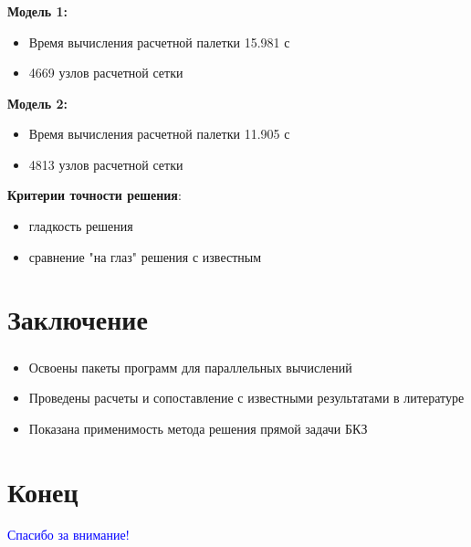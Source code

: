 \begin{frame}
\frametitle{\insertsection}

\textbf{Модель 1:}
\begin{itemize}
    \item Время вычисления расчетной палетки 15.981 с
    \item 4669 узлов расчетной сетки
\end{itemize}
\bigskip

\textbf{Модель 2:}
\begin{itemize}
    \item Время вычисления расчетной палетки 11.905 с
    \item 4813 узлов расчетной сетки
\end{itemize}
\bigskip

\textbf{Критерии точности решения}:
\begin{itemize}
    \item гладкость решения
    \item сравнение "на глаз" решения с известным
\end{itemize}
\end{frame}


\section{Заключение}

\begin{frame}
\frametitle{\insertsection}

\begin{itemize}
    \item Освоены пакеты программ для параллельных вычислений
    \item Проведены расчеты и сопоставление с известными результатами в литературе
    \item Показана применимость метода решения прямой задачи БКЗ
\end{itemize}
\end{frame}


\section{Конец}

\begin{frame}
\centering
\vfill
\textcolor{Blue}{\Large Спасибо за внимание!}
\vfill
\end{frame}